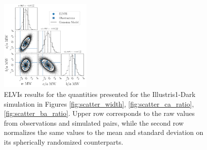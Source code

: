 \documentclass[a4paper,fleqn,usenatbib]{mnras}
\begin{document}
\begin{figure}
\includegraphics[width=0.40\textwidth]{gaussian_model_elvis_MW_n_11.pdf}
\caption{ELVIs results for the quantities presented for the Illustris1-Dark
  simulation in Figures  \ref{fig:scatter_width},
  \ref{fig:scatter_ca_ratio}, \ref{fig:scatter_ba_ratio}.
Upper row corresponds to the raw values from observations and
simulated pairs, while the second row normalizes the same values to
the mean and standard deviation on its spherically randomized
counterparts. 
\label{fig:all_plots_elvis}}
\end{figure}
\end{document}

